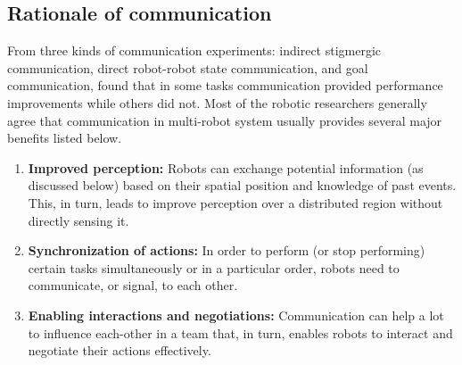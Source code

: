 \subsection{Rationale of communication}
From three kinds of communication experiments: indirect stigmergic communication, direct robot-robot state communication, and goal communication,   found that in some tasks communication provided performance improvements while others did not. Most of the robotic researchers generally agree that communication in multi-robot system usually provides several major benefits listed below.
\begin{enumerate}
\item \textbf{Improved perception: }
Robots can exchange potential information (as discussed below) based on their spatial position and knowledge of past events. This, in turn, leads to improve perception over a distributed region without directly sensing it.
\item \textbf{Synchronization of actions: }
In order to perform (or stop performing) certain tasks simultaneously or in a particular order, robots need to communicate, or signal, to each other. 
\item \textbf{Enabling interactions and negotiations: }
Communication can help a lot to influence each-other in a team that, in turn, enables robots to interact and negotiate their actions effectively.
\end{enumerate}
